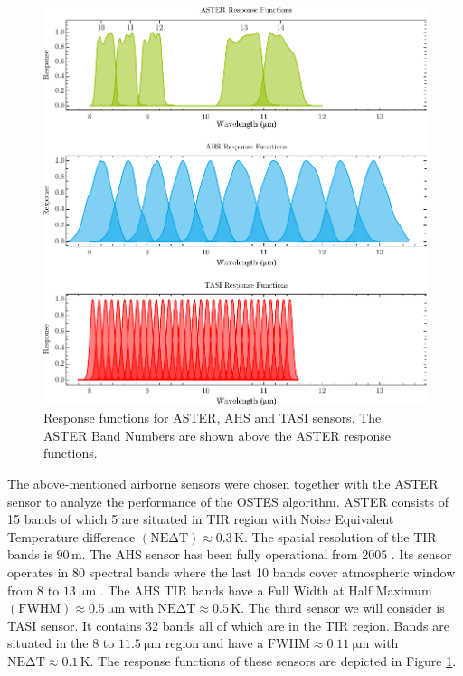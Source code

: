 \begin{figure}[!t]
\centering
\includegraphics[width=0.9\linewidth]{pics/Chapter_04/response_functions_all.pdf}
\vspace{1.5 em}
\caption{Response functions for ASTER, AHS and TASI sensors. The ASTER Band Numbers are shown above the ASTER response functions.}
\label{fig:ResponseFunctions}
\end{figure}
 
The above-mentioned airborne sensors were chosen together with the ASTER sensor to analyze the performance of the OSTES algorithm. ASTER consists of 15 bands of which 5 are situated in TIR region with Noise Equivalent Temperature difference $\mathrm{(NE\Delta T)} \approx 0.3\,\mathrm{K}$. The spatial resolution of the TIR bands is $90\,\mathrm{m}$. The AHS sensor has been fully operational from 2005 \cite{FM05}. Its sensor operates in 80 spectral bands where the last 10 bands cover atmospheric window from 8 to $\SI{13}{\micro\meter}$ \cite{SJ06}. The AHS TIR bands have a  {Full Width at Half Maximum} $\mathrm{(FWHM)} \approx \SI{0.5}{\micro\meter}$ with $\mathrm{NE\Delta T} \approx 0.5\,\mathrm{K}$. The third sensor we will consider is TASI sensor. It contains 32 bands all of which are in the TIR region. Bands are situated in the 8 to $\SI{11.5}{\micro\meter}$ region and have a $\mathrm{FWHM} \approx \SI{0.11}{\micro\meter}$ with $\mathrm{NE\Delta T} \approx 0.1\,\mathrm{K}$. The response functions of these sensors are depicted in Figure \ref{fig:ResponseFunctions}.

